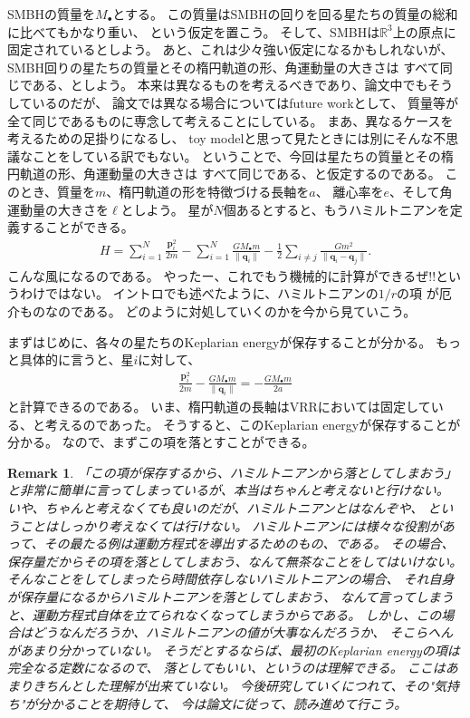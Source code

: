 \documentclass[10pt, pre, twocolumn, showpacs, aps]{revtex4-1}
\newtheorem{remark}{Remark}
\begin{document}
SMBHの質量を$M_{\bullet}$とする。
この質量はSMBHの回りを回る星たちの質量の総和に比べてもかなり重い、
という仮定を置こう。
そして、SMBHは$\mathbb{R}^{3}$上の原点に固定されているとしよう。
あと、これは少々強い仮定になるかもしれないが、
SMBH回りの星たちの質量とその楕円軌道の形、角運動量の大きさは
すべて同じである、としよう。
本来は異なるものを考えるべきであり、論文中でもそうしているのだが、
論文では異なる場合についてはfuture workとして、
質量等が全て同じであるものに専念して考えることにしている。
まあ、異なるケースを考えるための足掛りになるし、
toy modelと思って見たときには別にそんな不思議なことをしている訳でもない。
ということで、今回は星たちの質量とその楕円軌道の形、角運動量の大きさは
すべて同じである、と仮定するのである。
このとき、質量を$m$、楕円軌道の形を特徴づける長軸を$a$、
離心率を$e$、そして角運動量の大きさを$\ell$としよう。
星が$N$個あるとすると、もうハミルトニアンを定義することができる。
\begin{align}
H=\sum_{i=1}^{N}\frac{\pmb{p}_{i}^{2}}{2m}
-\sum_{i=1}^{N}\frac{GM_{\bullet}m}{\|\pmb{q}_{i}\|}
-\frac{1}{2}\sum_{i\ne j}\frac{Gm^{2}}{\|\pmb{q}_{i}-\pmb{q}_{j}\|}.
\end{align}
こんな風になるのである。
やったー、これでもう機械的に計算ができるぜ!!というわけではない。
イントロでも述べたように、ハミルトニアンの$1/r$の項
が厄介ものなのである。
どのように対処していくのかを今から見ていこう。

まずはじめに、各々の星たちのKeplarian energyが保存することが分かる。
もっと具体的に言うと、星$i$に対して、
\begin{align}
\frac{\pmb{p}_{i}^{2}}{2m}-\frac{GM_{\bullet}m}{\|\pmb{q}_{i}\|}=-\frac{GM_{\bullet}m}{2a}
\end{align}
と計算できるのである。
いま、楕円軌道の長軸はVRRにおいては固定している、と考えるのであった。
そうすると、このKeplarian energyが保存することが分かる。
なので、まずこの項を落とすことができる。
\begin{remark}
「この項が保存するから、ハミルトニアンから落としてしまおう」
と非常に簡単に言ってしまっているが、本当はちゃんと考えないと行けない。
いや、ちゃんと考えなくても良いのだが、ハミルトニアンとはなんぞや、
ということはしっかり考えなくては行けない。
ハミルトニアンには様々な役割があって、その最たる例は運動方程式を導出するためのもの、である。
その場合、保存量だからその項を落としてしまおう、なんて無茶なことをしてはいけない。
そんなことをしてしまったら時間依存しないハミルトニアンの場合、
それ自身が保存量になるからハミルトニアンを落としてしまおう、
なんて言ってしまうと、運動方程式自体を立てられなくなってしまうからである。
しかし、この場合はどうなんだろうか、ハミルトニアンの値が大事なんだろうか、
そこらへんがあまり分かっていない。
そうだとするならば、最初のKeplarian energyの項は完全なる定数になるので、
落としてもいい、というのは理解できる。
ここはあまりきちんとした理解が出来ていない。
今後研究していくにつれて、その"気持ち"が分かることを期待して、
今は論文に従って、読み進めて行こう。
\end{remark}
\end{document}
